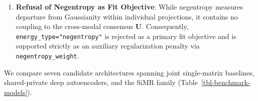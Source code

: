 \documentclass[
  10pt,
  letterpaper,
]{report}
\begin{document}
\begin{enumerate}
  \(\alpha_m = 1 / (|E_{m,0}| \cdot M + 10^{-10})\) is retained, because
  candidate operator-norm scalings lost up to 0.1441 in latent \(R^2\)
  and 0.2037 in loadings support \(F_1\) across synthetic cells
  (\texttt{docs/audit/evidence/view\_weighting\_acc.csv}). When opt-in
  Modality Alignment Index (\texttt{MAI}) weighting
  (\texttt{dynamic\_weights=True}) is active, each view's leave-one-out
  (\texttt{LOO}) agreement with the consensus is
  degree-of-freedom-corrected against the training sample size, gated
  against a permutation null floor, and bounded to \([0.01, 0.5]\)
  (\texttt{MAI\_WEIGHT\_BOUNDS}): no view supplies more than half the
  consensus, and a view without evidence of coupling falls to \(1\%\).
\item
  \textbf{Refusal of Negentropy as Fit Objective}: While negentropy
  measures departure from Gaussianity within individual projections, it
  contains no coupling to the cross-modal consensus \(\mathbf{U}\).
  Consequently, \texttt{energy\_type="negentropy"} is rejected as a
  primary fit objective and is supported strictly as an auxiliary
  regularization penalty via \texttt{negentropy\_weight}.
\end{enumerate}

We compare seven candidate architectures spanning joint single-matrix
baselines, shared-private deep autoencoders, and the SiMR family
(Table~\ref{tbl-benchmark-models}).
\end{document}
